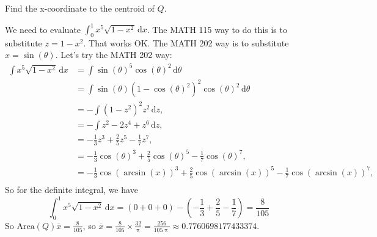\documentclass[12pt,fleqn,answers]{exam}
\begin{document}
\begin{questions}
\begin{solution}[1.0in]
    \end{solution}
    

    
       \question[2] Find the x-coordinate to the centroid of $Q$.
  \begin{solution}[2.0in] 
    We need to evaluate $\int_0^1 x^5 \sqrt{1-x^2} \, \mathrm{d} x$.
    The MATH 115 way to do this is to substitute $z = 1-x^2$. That 
    works OK.  The MATH 202 way is to substitute $x = \sin(\theta)$.
    Let's try the MATH 202 way:
    \begin{align*}
     \int x^5 \sqrt{1-x^2} \, \mathrm{d}x &= 
     \int \sin(\theta)^5 \cos(\theta)^2  \, \mathrm{d}\theta\\
     &= \int \sin(\theta) (1- \cos(\theta)^2)^2 \cos(\theta)^2  \, \mathrm{d}\theta\\
     &= -\int (1-z^2)^2 z^2 \, \mathrm{d} z,\\
     &= -\int z^2 - 2 z^4  + z^6 \, \mathrm{d} z,\\
     &= -\frac{1}{3} z^3 +\frac{2}{5} z^5 - \frac{1}{7} z^7, \\
     &= -\frac{1}{3} \cos(\theta)^3 +\frac{2}{5} \cos(\theta)^5 - \frac{1}{7} \cos(\theta)^7,\\
     &= -\frac{1}{3}\cos(\arcsin(x))^3 + \frac{2}{5} \cos(\arcsin(x))^5 - \frac{1}{7} \cos(\arcsin(x))^7,\\
          \end{align*}
   So for the definite integral, we have
   \begin{equation}
    \int_0^1  x^5 \sqrt{1-x^2} \, \mathrm{d}x
     = \left(0 + 0 + 0 \right) - \left(-\frac{1}{3} + \frac{2}{5} - \frac{1}{7}\right)
     = \frac{8}{105}
   \end{equation}   
   So $\text{Area}(Q) \overline{x} = \frac{8}{105}$, so
   $\overline{x} = \frac{8}{105} \times \frac{32}{\uppi}
   = \frac{256}{105 \uppi} \approx 0.7760698177433374.$
    \end{solution}
\end{questions}
\end{document}
